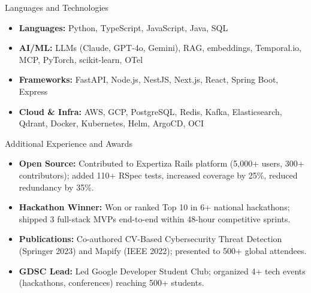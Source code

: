 \documentclass[]{mcdowellcv}
\begin{document}
\begin{cvsection}{Languages and Technologies}
  \begin{cvsubsection}{}{}{}
    \begin{itemize}
      \item \textbf{Languages:} Python, TypeScript, JavaScript, Java, SQL
      \item \textbf{AI/ML:} LLMs (Claude, GPT-4o, Gemini), RAG, embeddings, Temporal.io, MCP, PyTorch, scikit-learn, OTel
      \item \textbf{Frameworks:} FastAPI, Node.js, NestJS, Next.js, React, Spring Boot, Express
      \item \textbf{Cloud \& Infra:} AWS, GCP, PostgreSQL, Redis, Kafka, Elasticsearch, Qdrant, Docker, Kubernetes, Helm, ArgoCD, OCI
    \end{itemize}
  \end{cvsubsection}
\end{cvsection}

\begin{cvsection}{Additional Experience and Awards}
  \begin{cvsubsection}{}{}{}
    \begin{itemize}
      \item \textbf{Open Source:} Contributed to Expertiza Rails platform (5,000+ users, 300+ contributors); added 110+ RSpec tests, increased coverage by 25\%, reduced redundancy by 35\%.
      \item \textbf{Hackathon Winner:} Won or ranked Top 10 in 6+ national hackathons; shipped 3 full-stack MVPs end-to-end within 48-hour competitive sprints.
      \item \textbf{Publications:} Co-authored CV-Based Cybersecurity Threat Detection (Springer 2023) and Mapify (IEEE 2022); presented to 500+ global attendees.
      \item \textbf{GDSC Lead:} Led Google Developer Student Club; organized 4+ tech events (hackathons, conferences) reaching 500+ students.
    \end{itemize}
  \end{cvsubsection}
\end{cvsection}
\end{document}
